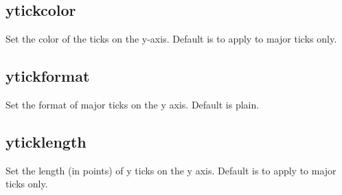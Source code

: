 \documentclass[letterpaper,10pt,english]{sphinxmanual}
\begin{document}
\begin{sphinxVerbatim}[commandchars=\\\{\}]
\PYG{p}{[}\PYG{p}{]}    
\end{sphinxVerbatim}


\subsection{ytickcolor}
\label{\detokenize{plot_control_cmds:ytickcolor}}
Set the color of the ticks on the y-axis. Default is to apply to major ticks only.

\begin{sphinxVerbatim}[commandchars=\\\{\}]
\PYG{p}{[}\PYG{p}{]}     \PYG{p}{[}     \PYG{p}{]}
\end{sphinxVerbatim}


\subsection{ytickformat}
\label{\detokenize{plot_control_cmds:ytickformat}}
Set the format of major ticks on the y axis. Default is plain.

\begin{sphinxVerbatim}[commandchars=\\\{\}]
\PYG{p}{[}\PYG{p}{]}        
\end{sphinxVerbatim}


\subsection{yticklength}
\label{\detokenize{plot_control_cmds:yticklength}}
Set the length (in points) of y ticks on the y axis. Default is to apply to major ticks only.

\begin{sphinxVerbatim}[commandchars=\\\{\}]
\PYG{p}{[}\PYG{p}{]}   \PYG{p}{[}     \PYG{p}{]}
\end{sphinxVerbatim}
\end{document}
